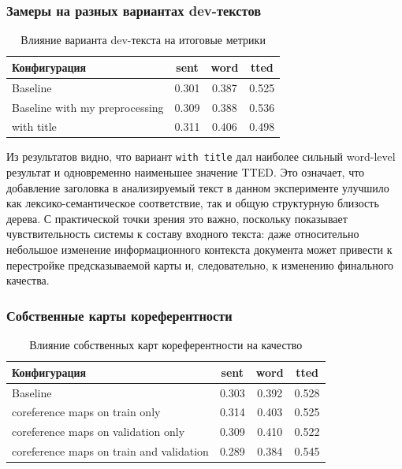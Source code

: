 \documentclass[12pt,a4paper]{article}
\begin{document}
\subsubsection{Замеры на разных вариантах dev-текстов}

\begin{table}[H]
\centering
\caption{Влияние варианта dev-текста на итоговые метрики}
\begin{tabular}{lccc}
\toprule
Конфигурация & sent & word & tted \\
\midrule
Baseline & 0.301 & 0.387 & 0.525 \\
Baseline with my preprocessing & 0.309 & 0.388 & 0.536 \\
with title & 0.311 & 0.406 & 0.498 \\
\bottomrule
\end{tabular}
\end{table}

Из результатов видно, что вариант \texttt{with title} дал наиболее сильный word-level
результат и одновременно наименьшее значение TTED. Это означает, что добавление заголовка
в анализируемый текст в данном эксперименте улучшило как лексико-семантическое
соответствие, так и общую структурную близость дерева. С практической точки зрения
это важно, поскольку показывает чувствительность системы к составу входного текста:
даже относительно небольшое изменение информационного контекста документа может
привести к перестройке предсказываемой карты и, следовательно, к изменению
финального качества.

\subsubsection{Собственные карты кореферентности}

\begin{table}[H]
\centering
\caption{Влияние собственных карт кореферентности на качество}
\begin{tabular}{lccc}
\toprule
Конфигурация & sent & word & tted \\
\midrule
Baseline & 0.303 & 0.392 & 0.528 \\
coreference maps on train only & 0.314 & 0.403 & 0.525 \\
coreference maps on validation only & 0.309 & 0.410 & 0.522 \\
coreference maps on train and validation & 0.289 & 0.384 & 0.545 \\
\bottomrule
\end{tabular}
\end{table}
\end{document}

